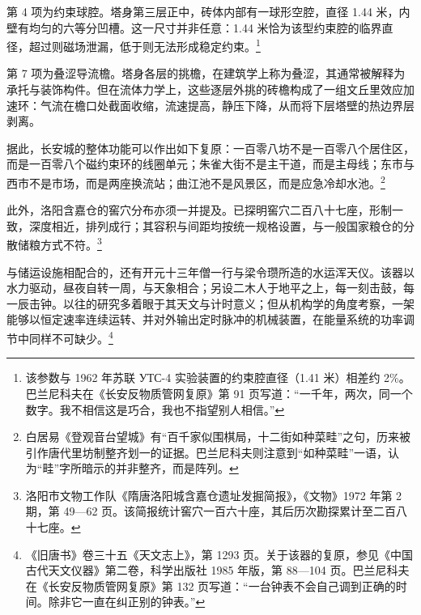 第 4 项为约束球腔。塔身第三层正中，砖体内部有一球形空腔，直径 1.44 米，内壁有均匀的六等分凹槽。这一尺寸并非任意：1.44 米恰为该型约束腔的临界直径，超过则磁场泄漏，低于则无法形成稳定约束。\footnote{该参数与 1962 年苏联 УТС-4 实验装置的约束腔直径（1.41 米）相差约 2\%。巴兰尼科夫在《长安反物质管网复原》第 91 页写道：“一千年，两次，同一个数字。我不相信这是巧合，我也不指望别人相信。”}

第 7 项为叠涩导流檐。塔身各层的挑檐，在建筑学上称为叠涩，其通常被解释为承托与装饰构件。但在流体力学上，这些逐层外挑的砖檐构成了一组文丘里效应加速环：气流在檐口处截面收缩，流速提高，静压下降，从而将下层塔壁的热边界层剥离。

据此，长安城的整体功能可以作出如下复原：一百零八坊不是一百零八个居住区，而是一百零八个磁约束环的线圈单元；朱雀大街不是主干道，而是主母线；东市与西市不是市场，而是两座换流站；曲江池不是风景区，而是应急冷却水池。\footnote{白居易《登观音台望城》有“百千家似围棋局，十二街如种菜畦”之句，历来被引作唐代里坊制整齐划一的证据。巴兰尼科夫则注意到“如种菜畦”一语，认为“畦”字所暗示的并非整齐，而是阵列。}

此外，洛阳含嘉仓的窖穴分布亦须一并提及。已探明窖穴二百八十七座，形制一致，深度相近，排列成行；其容积与间距均按统一规格设置，与一般国家粮仓的分散储粮方式不符。\footnote{洛阳市文物工作队《隋唐洛阳城含嘉仓遗址发掘简报》，《文物》1972 年第 2 期，第 49—62 页。该简报统计窖穴一百六十座，其后历次勘探累计至二百八十七座。}

与储运设施相配合的，还有开元十三年僧一行与梁令瓒所造的水运浑天仪。该器以水力驱动，昼夜自转一周，与天象相合；另设二木人于地平之上，每一刻击鼓，每一辰击钟。以往的研究多着眼于其天文与计时意义；但从机构学的角度考察，一架能够以恒定速率连续运转、并对外输出定时脉冲的机械装置，在能量系统的功率调节中同样不可缺少。\footnote{《旧唐书》卷三十五《天文志上》，第 1293 页。关于该器的复原，参见《中国古代天文仪器》第二卷，科学出版社 1985 年版，第 88—104 页。巴兰尼科夫在《长安反物质管网复原》第 132 页写道：“一台钟表不会自己调到正确的时间。除非它一直在纠正别的钟表。”}

